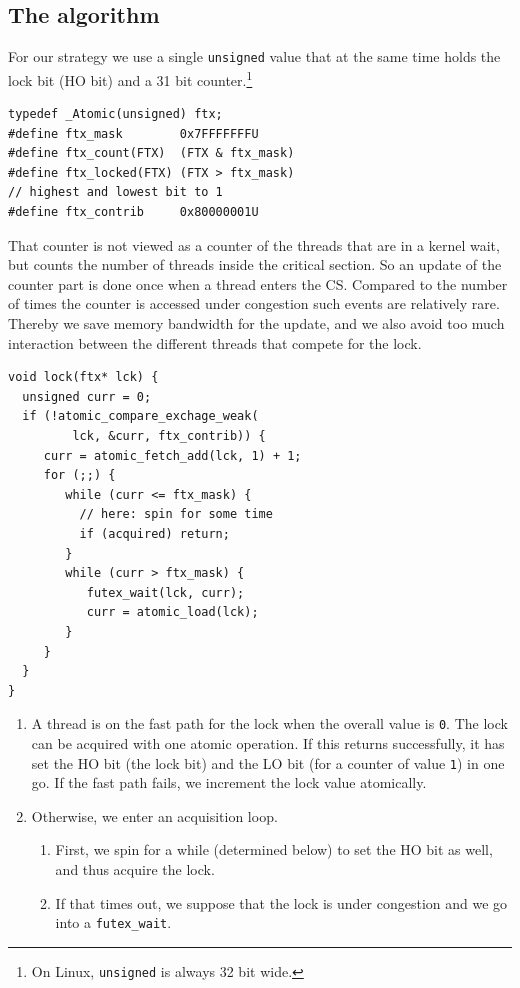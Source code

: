 \documentclass{sig-alternate-05-2015}
\begin{document}
\subsection{The algorithm}
\label{sec-3-1}

For our strategy we use a single \texttt{unsigned} value that at the same
time holds the lock bit (HO bit) and a 31 bit counter.\footnote{On Linux, \texttt{unsigned} is always 32 bit wide.}

\lstset{language=C11,label= ,caption= ,numbers=none}
\begin{lstlisting}
typedef _Atomic(unsigned) ftx;
#define ftx_mask        0x7FFFFFFFU
#define ftx_count(FTX)  (FTX & ftx_mask)
#define ftx_locked(FTX) (FTX > ftx_mask)
// highest and lowest bit to 1
#define ftx_contrib     0x80000001U
\end{lstlisting}

That counter is not viewed as a counter of the threads that are in
a kernel wait, but counts the number of threads inside the critical
section.  So an update of the counter part is done once when a
thread enters the CS. Compared to the number of times
the counter is accessed under congestion such events are relatively
rare. Thereby we save memory bandwidth for the update, and we also
avoid too much interaction between the different threads that
compete for the lock.

\lstset{language=C11,label= ,caption= ,numbers=none}
\begin{lstlisting}
void lock(ftx* lck) {
  unsigned curr = 0;
  if (!atomic_compare_exchage_weak(
         lck, &curr, ftx_contrib)) {
     curr = atomic_fetch_add(lck, 1) + 1;
     for (;;) {
        while (curr <= ftx_mask) {
          // here: spin for some time
          if (acquired) return;
        }
        while (curr > ftx_mask) {
           futex_wait(lck, curr);
           curr = atomic_load(lck);
        }
     }
  }
}
\end{lstlisting}

\begin{enumerate}
\item A thread is on the fast path for the lock when the overall value
is \texttt{0}. The lock can be acquired with one atomic operation.  If
this returns successfully, it has set the HO bit (the lock bit)
and the LO bit (for a counter of value \texttt{1}) in one go. If the
fast path fails, we increment the lock value atomically.

\item Otherwise, we enter an acquisition loop.\vspace*{-2ex}

\begin{enumerate}
\item First, we spin for a while (determined below) to set the HO
bit as well, and thus acquire the lock.

\item If that times out, we suppose that the lock is under
congestion and we go into a \texttt{futex\_wait}.\vspace*{-2ex}
\end{enumerate}
\end{enumerate}
\end{document}
